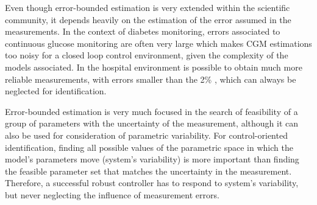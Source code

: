 
Even though error-bounded estimation is very extended within the scientific community, it depends heavily on the estimation of the error assumed in the measurements. In the context of diabetes monitoring, errors associated to continuous glucose monitoring are often very large \cite{mazze2009evaluating} which makes CGM estimations too noisy for a closed loop control environment, given the complexity of the models associated. In the hospital environment is possible to obtain much more reliable measurements, with errors smaller than the 2\% \cite{nowotny2012precision}, which can always be neglected for identification. 

Error-bounded estimation is very much focused in the search of feasibility of a group of parameters with the uncertainty of the measurement, although it can also be used for consideration of parametric variability. For control-oriented identification, finding all possible values of the parametric space in which the model's parameters move (system's variability) is more important than finding the feasible parameter set that matches the uncertainty in the measurement. Therefore, a successful robust controller has to respond to system's variability, but never neglecting the influence of measurement errors.

